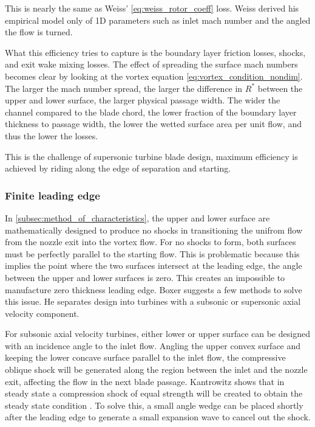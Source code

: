 This is nearly the same as Weiss' \cref{eq:weiss_rotor_coeff} loss. Weiss derived his empirical model only of 1D parameters such as inlet mach number and the angled the flow is turned. 

What this efficiency tries to capture is the boundary layer friction losses, shocks, and exit wake mixing losses. The effect of spreading the surface mach numbers becomes clear by looking at the vortex equation \cref{eq:vortex_condition_nondim}. The larger the mach number spread, the larger the difference in $R^*$ between the upper and lower surface, the larger physical passage width. The wider the channel compared to the blade chord, the lower fraction of the boundary layer thickness to passage width, the lower the wetted surface area per unit flow, and thus the lower the losses.

This is the challenge of supersonic turbine blade design, maximum efficiency is achieved by riding along the edge of separation and starting.


\subsubsection{Finite leading edge}

In \cref{subsec:method_of_characteristics}, the upper and lower surface are mathematically designed to produce no shocks in transitioning the unifrom flow from the nozzle exit into the vortex flow. For no shocks to form, both surfaces must be perfectly parallel to the starting flow. This is problematic because this implies the point where the two surfaces intersect at the leading edge, the angle between the upper and lower surfaces is zero. This creates an impossible to manufacture zero thickness leading edge. Boxer suggests a few methods to solve this issue. He separates design into turbines with a subsonic or supersonic axial velocity component. 

For subsonic axial velocity turbines, either lower or upper surface can be designed with an incidence angle to the inlet flow. Angling the upper convex surface and keeping the lower concave surface parallel to the inlet flow, the compressive oblique shock will be generated along the region between the inlet and the nozzle exit, affecting the flow in the next blade passage. Kantrowitz shows that in steady state a compression shock of equal strength will be created to obtain the steady state condition \cite{kantrowitz}. To solve this, a small angle wedge can be placed shortly after the leading edge to generate a small expansion wave to cancel out the shock. 

